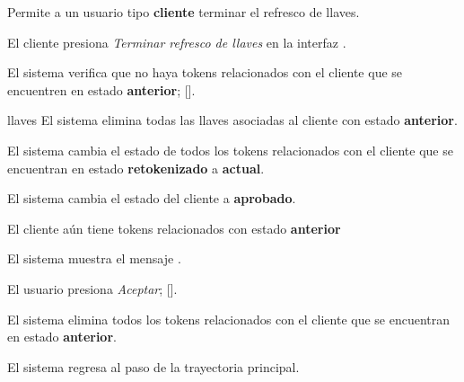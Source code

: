 %
%

{
  Permite a un usuario tipo \textbf{cliente} terminar el refresco de llaves.

  \begin{trayectoriaPrincipal}

    \item El cliente presiona \textit{Terminar refresco de llaves} en la
      interfaz .

    \item El sistema verifica que no haya tokens relacionados con el cliente
      que se encuentren en estado \textbf{anterior};
      [].

    \item[llaves] El sistema elimina todas las llaves asociadas al cliente con
      estado \textbf{anterior}.

    \item El sistema cambia el estado de todos los tokens relacionados con el
      cliente que se encuentran en estado \textbf{retokenizado} a
      \textbf{actual}.

    \item El sistema cambia el estado del cliente a \textbf{aprobado}.

  \end{trayectoriaPrincipal}


  \begin{trayectoriaAlternativa}
    {El cliente aún tiene tokens relacionados con estado \textbf{anterior}}

    \item El sistema muestra el mensaje
      .

    \item El usuario presiona \textit{Aceptar};
      [].

    \item El sistema elimina todos los tokens relacionados con el cliente que se
      encuentran en estado \textbf{anterior}.

    \item El sistema regresa al paso  de la trayectoria
      principal.


\end{trayectoriaAlternativa}}
